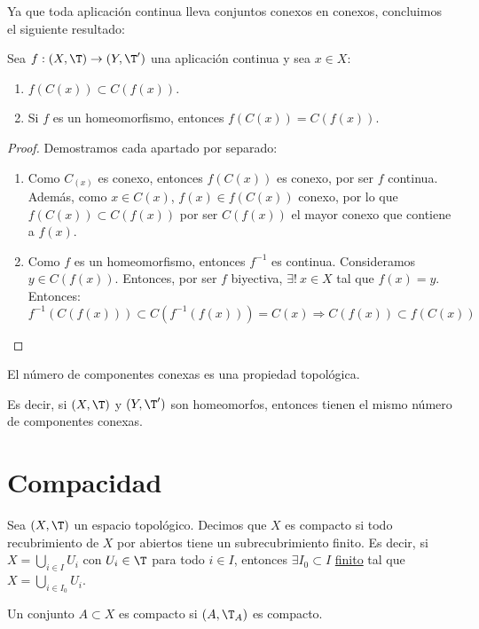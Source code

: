 Ya que toda aplicación continua lleva conjuntos conexos en conexos, concluimos el siguiente resultado:
\begin{prop}
    Sea $f:(X,\T)\to (Y,\T')$ una aplicación continua y sea $x\in X$:
    \begin{enumerate}
        \item $f(C(x))\subset C(f(x))$.
        \item Si $f$ es un homeomorfismo, entonces $f(C(x))=C(f(x))$.
    \end{enumerate}
\end{prop}
\begin{proof}
    Demostramos cada apartado por separado:
    \begin{enumerate}
        \item Como $C_(x)$ es conexo, entonces $f(C(x))$ es conexo, por ser $f$ continua.
        Además, como $x\in C(x)$, $f(x)\in f(C(x))$ conexo, por lo que $f(C(x))\subset C(f(x))$ por ser $C(f(x))$ el mayor conexo que contiene a $f(x)$.
        \item Como $f$ es un homeomorfismo, entonces $f^{-1}$ es continua. Consideramos $y\in C(f(x))$. Entonces, por ser $f$ biyectiva, $\exists!~x\in X$ tal que $f(x)=y$. Entonces:
        \begin{equation*}
            f^{-1}(C(f(x))) \subset C(f^{-1}(f(x))) = C(x) \Longrightarrow C(f(x)) \subset f(C(x))
        \end{equation*}
    \end{enumerate}
\end{proof}
\begin{coro}
    El número de componentes conexas es una propiedad topológica.

    Es decir, si $(X,\T)$ y $(Y,\T')$ son homeomorfos, entonces tienen el mismo número de componentes conexas.
\end{coro}


\section{Compacidad}

\begin{definicion}
    Sea $(X,\T)$ un espacio topológico. Decimos que $X$ es compacto si todo recubrimiento de $X$ por abiertos tiene un subrecubrimiento finito.
    Es decir, si $X=\bigcup\limits_{i\in I}U_i$ con $U_i\in \T$ para todo $i\in I$, entonces $\exists I_0\subset I$ \ul{finito} tal que $X=\bigcup\limits_{i\in I_0}U_i$.

    Un conjunto $A\subset X$ es compacto si $(A,\T_{A})$ es compacto.
\end{definicion}

